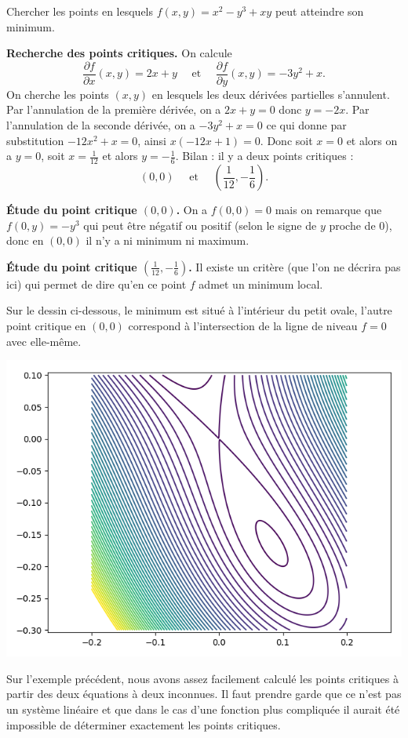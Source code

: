 \begin{exemple}{}{}
	Chercher les points en lesquels $f(x,y) = x^2-y^3+xy$ peut atteindre son minimum.
	
	\textbf{Recherche des points critiques.}
	On calcule 
	$$\frac{\partial f}{\partial x}(x,y) = 2x+y 
	\quad \text{ et } \quad 
	\frac{\partial f}{\partial y}(x,y) = -3y^2+x.$$
	On cherche les points $(x,y)$ en lesquels les deux dérivées partielles s'annulent.
	Par l'annulation de la première dérivée, on a $2x+y=0$ donc $y=-2x$.
	Par l'annulation de la seconde dérivée, on a $-3y^2+x=0$ ce qui donne par substitution
	$-12x^2+x=0$, ainsi $x(-12x+1)=0$.
	Donc soit $x=0$ et alors on a $y=0$, soit $x=\frac1{12}$ et alors $y=-\frac16$.
	Bilan : il y a deux points critiques :
	$$\left(0,0\right) \quad \text{ et } \quad \left(\frac1{12},-\frac16\right).$$
	
	\textbf{\'Etude du point critique $(0,0)$.}
	On a $f(0,0)=0$ mais on remarque que $f(0,y)=-y^3$ qui peut être négatif ou positif (selon le signe de $y$ proche de $0$), donc en $(0,0)$ il n'y a ni minimum ni maximum.
	
	\textbf{\'Etude du point critique $(\frac1{12},-\frac16)$.}
	Il existe un critère (que l'on ne décrira pas ici) qui permet de dire qu'en ce point $f$ admet un minimum local.
	
	Sur le dessin ci-dessous, le minimum est situé à l'intérieur du petit ovale, l'autre point critique en $(0,0)$ correspond à l'intersection de la ligne de niveau $f=0$ avec elle-même.
	\begin{center}
		\includegraphics[scale=\myscale,scale=0.7]{figures/gradient-surface-6}
	\end{center}
	
\end{exemple}
Sur l'exemple précédent, nous avons assez facilement calculé les points critiques à partir des deux équations à deux inconnues. Il faut prendre garde que ce n'est pas un système linéaire et que dans le cas d'une fonction plus compliquée il aurait été impossible de déterminer exactement les points critiques.

